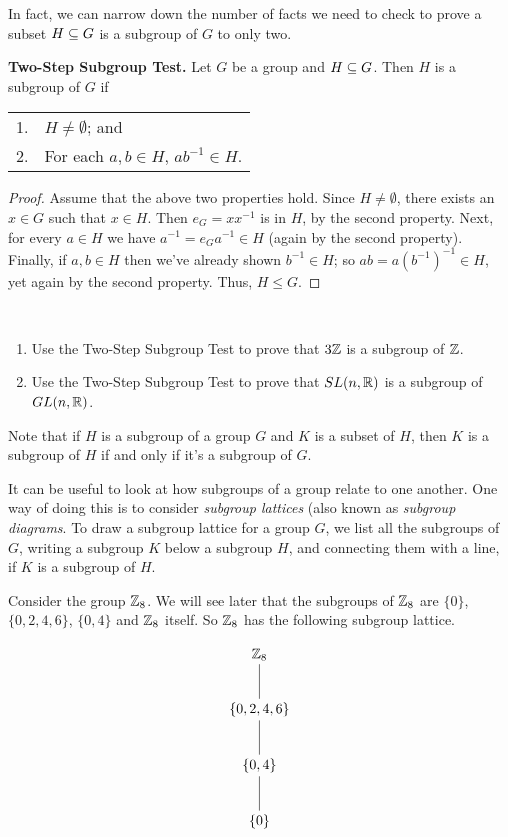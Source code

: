  In fact, we can narrow down the number of facts we need to
check to prove a subset $H\subseteq G$ is a subgroup of $G$ to only
two.

\begin{thm}\label{twostep} \textbf{Two-Step Subgroup Test.} Let $G$ be
a group and $H\subseteq G$.  Then $H$ is a subgroup of $G$ if
\begin{center}
\begin{tabular}{ll}
1.& $H\neq \emptyset$; and\\
2.& For each $a,b\in H$, $ab^{-1}\in H$.
\end{tabular}
\end{center}
\end{thm}

\begin{proof} Assume that the above two properties hold.   Since $H\neq
\emptyset$, there exists an $x\in G$ such that $x\in H$.  Then
$e_G=xx^{-1}$ is in $H$, by the second property. Next, for every
$a\in H$ we have $a^{-1}=e_Ga^{-1}\in H$ (again by the second
property). Finally, if $a,b\in H$ then we've already shown
$b^{-1}\in H$; so $ab=a(b^{-1})^{-1}\in H$, yet again by the second
property.  Thus, $H\leq G$.\end{proof}

\begin{example}{}\
 \begin{enumerate}\item Use the Two-Step Subgroup Test to prove that $3\mathbb{Z}$ is a subgroup of $\mathbb{Z}$.
\item Use the Two-Step Subgroup Test to prove that $SL(n,\mathbb{R})$ is a subgroup of $GL(n,\mathbb{R})$. \end{enumerate}
\end{example}

\begin{df} Note that if $H$ is a subgroup of a group $G$ and $K$ is a subset of $H$, then $K$ is a subgroup of
  $H$ if and only if it's a subgroup of $G$.\end{df}


It can be useful to look at how subgroups of a group relate to one
another.  One way of doing this is to consider \textit{subgroup
lattices} (also known as \textit{subgroup diagrams}.  To draw a
subgroup lattice for a group $G$, we list all the subgroups of $G$,
writing a subgroup $K$ below a subgroup $H$, and connecting them
with a line, if $K$ is a subgroup of $H$.

\begin{example}{} Consider the group $\mathbb{Z}_8$. We will see later that the subgroups of $\mathbb{Z}_8$ are $\{0\}$, $\{0,2,4,6\}$, $\{0,4\}$ and $\mathbb{Z}_8$ itself.  So $\mathbb{Z}_8$ has the following subgroup lattice.

$$\xymatrix{&\Z_8 \ar@{-}[d]&\\ &\{0,2,4,6\}\ar@{-}[d]&\\ &\{0,4\} \ar@{-}[d]&\\ &\{0\} &} $$
\end{example}


